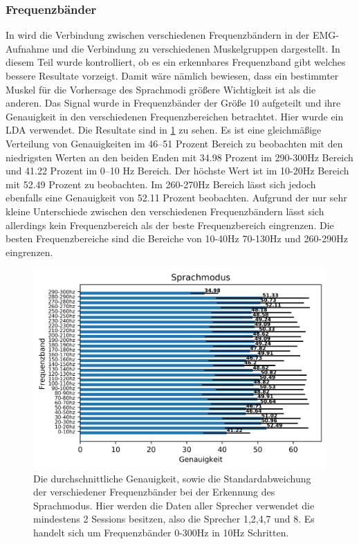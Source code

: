 \subsubsection{Frequenzbänder}
In \cite{Avan2001-BOX} wird die Verbindung zwischen verschiedenen Frequenzbändern in der EMG-Aufnahme und die Verbindung zu verschiedenen Muskelgruppen dargestellt. In diesem Teil wurde kontrolliert, ob es ein erkennbares Frequenzband gibt welches bessere Resultate vorzeigt. Damit wäre nämlich bewiesen, dass ein bestimmter Muskel für die Vorhersage des Sprachmodi größere Wichtigkeit ist als die anderen. Das Signal wurde in Frequenzbänder der Größe 10 aufgeteilt und ihre Genauigkeit in den verschiedenen Frequenzbereichen betrachtet. Hier wurde ein LDA verwendet. Die Resultate sind in \ref{fig:mode3} zu sehen. Es ist eine gleichmäßige Verteilung von Genauigkeiten im 46–51 Prozent Bereich zu beobachten mit den niedrigsten Werten an den beiden Enden mit 34.98 Prozent im 290-300Hz Bereich und 41.22 Prozent im 0–10 Hz Bereich. Der höchste Wert ist im 10-20Hz Bereich mit 52.49 Prozent zu beobachten. Im 260-270Hz Bereich lässt sich jedoch ebenfalls eine Genauigkeit von 52.11 Prozent beobachten. Aufgrund der nur sehr kleine Unterschiede zwischen den verschiedenen Frequenzbändern lässt sich allerdings kein Frequenzbereich als der beste Frequenzbereich eingrenzen. Die besten Frequenzbereiche sind die Bereiche von 10-40Hz 70-130Hz und 260-290Hz eingrenzen.
\begin{figure}[H]
  
  \includegraphics[width=\linewidth]{hzFreqBandResultsSession.png}
  \caption{Die durchschnittliche Genauigkeit, sowie die Standardabweichung der verschiedener Frequenzbänder bei der Erkennung des Sprachmodus. Hier werden die Daten aller Sprecher verwendet die mindestens 2 Sessions besitzen, also die Sprecher 1,2,4,7 und 8. Es handelt sich um Frequenzbänder 0-300Hz in 10Hz Schritten.}
  \label{fig:mode3}
  \end{figure}

